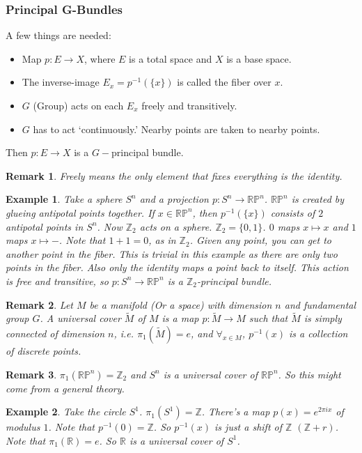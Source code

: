 \documentclass{article}
\theoremstyle{mystyle}
\newtheorem{example}{Example}[section]
\newtheorem{remark}{Remark}[section]
\begin{document}
\subsubsection{Principal G-Bundles}
A few things are needed:
\begin{itemize}
    \item Map $p:E\rightarrow X$, where $E$ is a total space and $X$ is a base space.
    \item The inverse-image $E_{x} = p^{-1}(\{x\})$ is called the fiber over $x$.
    \item $G$ (Group) acts on each $E_{x}$ freely and transitively.
    \item $G$ has to act `continuously.' Nearby points are taken to nearby points.
\end{itemize}
Then $p:E\rightarrow X$ is a $G-$principal bundle.
\begin{remark}
Freely means the only element that fixes everything is the identity.
\end{remark}
\begin{example}
Take a sphere $S^{n}$ and a projection $p:S^{n} \rightarrow \mathbb{RP}^{n}$. $\mathbb{RP}^{n}$ is created by glueing antipotal points together. If $x\in \mathbb{RP}^{n}$, then $p^{-1}(\{x\})$ consists of $2$ antipotal points in $S^{n}$. Now $\mathbb{Z}_{2}$ acts on a sphere. $\mathbb{Z}_{2} = \{0,1\}$. $0$ maps $x \mapsto x$ and $1$ maps $x\mapsto -$. Note that $1+1 = 0$, as in $\mathbb{Z}_{2}$. Given any point, you can get to another point in the fiber. This is trivial in this example as there are only two points in the fiber. Also only the identity maps a point back to itself. This action is free and transitive, so $p:S^{n} \rightarrow \mathbb{RP}^{n}$ is a $\mathbb{Z}_{2}$-principal bundle.
\end{example}
\begin{remark}
Let $M$ be a manifold (Or a space) with dimension $n$ and fundamental group $G$. A universal cover $\tilde{M}$ of $M$ is a map $p:\tilde{M}\rightarrow M$ such that $\tilde{M}$ is simply connected of dimension $n$, i.e. $\pi_{1}(\tilde{M}) = e$, and $\forall_{x\in M}$, $p^{-1}(x)$ is a collection of discrete points.
\end{remark}
\begin{remark}
$\pi_{1}(\mathbb{RP}^{n}) = \mathbb{Z}_{2}$ and $S^{n}$ is a universal cover of $\mathbb{RP}^{n}$. So this might come from a general theory.
\end{remark}
\begin{example}
Take the circle $S^{1}$. $\pi_{1}(S^{1}) = \mathbb{Z}$. There's a map $p(x) = e^{2\pi i x}$ of modulus $1$. Note that $p^{-1}(0) = \mathbb{Z}$. So $p^{-1}(x)$ is just a shift of $\mathbb{Z}$ $(\mathbb{Z}+r)$. Note that $\pi_{1}(\mathbb{R}) = e$. So $\mathbb{R}$ is a universal cover of $S^{1}$.
\end{example}
\end{document}
